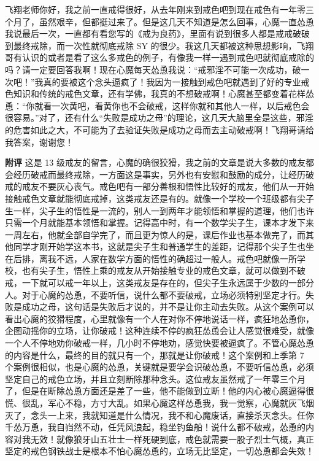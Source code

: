 \begin{case}
    飞翔老师你好，我之前一直戒得很好，从去年刚来到戒色吧到现在戒色有一年零三个月了，虽然艰辛，但都挺过来了。但是这几天不知道是怎么回事，心魔一直怂恿我说最后一次，一直都有看您写的《戒为良药》，里面有说到很多人都是戒戒破破到最终戒除，而一次性就彻底戒除 SY 的很少。我这几天都被这种思想影响，飞翔哥有认识的或者是看了这么多戒色的例子，有像我一样一遇到戒色吧就彻底戒除的吗？请一定要回答我啊！现在心魔每天怂恿我说：“戒邪淫不可能一次成功，破一次吧！”我真的要被这个念头逼疯了！我因为一接触到戒色吧就遇到了好的专业戒色知识和传统的戒色文章，还有学佛，我真的不想破戒啊！心魔甚至都变着花样怂恿：“你就看一次黄吧，看黄你也不会破戒，这样你就和其他人一样，以后戒色会很容易。”对了，还有什么“失败是成功之母”的理论，这几天大脑里全是这些，邪淫的危害如此之大，不可能为了去验证失败是成功之母而去主动破戒啊！飞翔哥请给我答案，谢谢您！

    \textbf{附评} 这是 13 级戒友的留言，心魔的确很狡猾，我之前的文章是说大多数的戒友都会经历破戒而最终戒除，一方面这是事实，另外也有安慰和鼓励的成分，让经历破戒的戒友不要灰心丧气。戒色吧有一部分善根和悟性比较好的戒友，他们从一开始接触戒色文章就能彻底戒掉，这类戒友还是有的。就像一个学校一个班级都有尖子生一样，尖子生的悟性是一流的，别人一到两年才能领悟和掌握的道理，他们也许只需一个月就能基本领悟和掌握。记得高中时，有一个数学尖子生，课本才发下来一周左右，他就全部自学完了，而且更为惊人的是，课后作业也基本做完了，而其他同学才刚开始学这本书，这就是尖子生和普通学生的差距，记得那个尖子生也坐在后排，离我不远，人家在数学方面的悟性的确超过一般人。戒色吧就像一所学校，也有尖子生，悟性上乘的戒友从开始接触专业的戒色文章，就可以做到不破戒，一下就可以戒一年以上，这类戒友是存在的，但尖子生永远属于少数的一部分人。对于心魔的怂恿，不要听信，说什么都不要破戒，立场必须特别坚定才行。失败是成功之母，这句话是失败后才说的，并不是让你主动去失败。从这个案例可以看出心魔的狡猾程度，心里就像有一个人在对你不停地说话一样，疯狂地怂恿你，企图动摇你的立场，让你破戒！这种连续不停的疯狂怂恿会让人感觉很难受，就像一个人不停地劝你破戒一样，几小时不停地劝，感觉快要被逼疯了。不管心魔怂恿的内容是什么，最终的目的就只有一个，那就是让你破戒！这个案例和上季第 7 个案例很相似，也是心魔的怂恿，关键就是要学会识破怂恿，不要听信怂恿，必须坚定自己的戒色立场，并且立刻断除那种念头。这位戒友虽然戒了一年零三个月了，但是在断除怂恿方面还是差了一些，他不能做到立断！他的内心被心魔逼得很慌、很乱，军心不稳，方寸大乱。如果心魔这样怂恿我，我一觉察，心魔就灰飞烟灭了，念头一上来，我就知道是什么情况，我不和心魔废话，直接杀灭念头。任你千怂万恿，我自岿然不动，任凭风浪起，稳坐钓鱼船！说什么都不破戒，怂恿的内容对我无效！就像狼牙山五壮士一样死硬到底，戒色就需要一股子烈士气概，真正坚定的戒色钢铁战士是根本不怕心魔怂恿的，立场无比坚定，一切怂恿都会失效！
\end{case}

